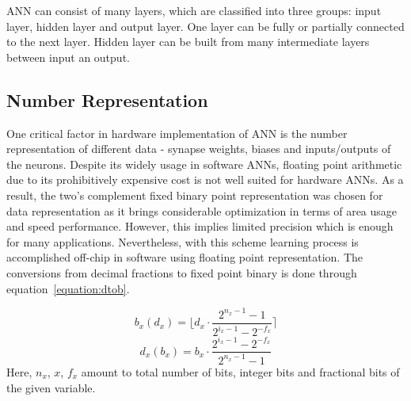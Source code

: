 ANN can consist of many layers, which are classified into three groups: input layer, hidden layer and output layer. One layer can be fully or partially connected to the next layer. Hidden layer can be built from many intermediate layers between input an output. 

\subsection*{Number Representation}

One critical factor in hardware implementation of ANN is the number representation of different data - synapse weights, biases and inputs/outputs of the neurons. Despite its widely usage in software ANNs, floating point arithmetic due to its prohibitively expensive cost is not well suited for hardware ANNs. As a result, the two's complement fixed binary point representation was chosen for data representation as it brings considerable optimization in terms of area usage and speed performance. However, this implies limited precision which is enough for many applications. Nevertheless, with this scheme learning process is accomplished off-chip in software using floating point representation. The conversions from decimal fractions to fixed point binary is done through equation~\ref{equation:dtob}.

\begin{equation}
b_{x}(d_{x})= \lfloor{d_{x}\cdot \frac{2^{n_{x}-1}-1}{2^{i_{x}-1}-2^{-f_{x}}}}\rceil
\label{equation:dtob}
\end{equation}
\begin{equation}
d_{x}(b_{x})= {b_{x}\cdot \frac{2^{i_{x}-1}-2^{-f_{x}}}{2^{n_{x}-1}-1}}
\label{equation:btod}
\end{equation}
Here, $n_{x}$, ${x}$, $f_{x}$ amount to total number of bits, integer bits and fractional bits of the given variable.

